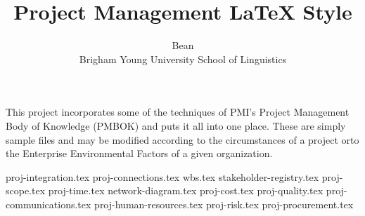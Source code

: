 
\setlength{\topmargin}{-.5in}
\setlength{\textheight}{9in}
\setlength{\oddsidemargin}{.125in}
\setlength{\textwidth}{6.25in}



\title{Project Management {LaTeX} Style}

\author{Bean\\
Brigham Young University School of Linguistics}
\renewcommand{\today}{April 13, 2013}
\maketitle
This project incorporates some of the techniques of PMI's Project Management Body of Knowledge\textregistered {} (PMBOK) and puts it all into one place. These are simply sample files and may be modified according to the circumstances of a project orto the Enterprise Environmental Factors of a given organization.


 {proj-integration.tex}
 {proj-connections.tex}
 {wbs.tex}
 {stakeholder-registry.tex}
 {proj-scope.tex}
 {proj-time.tex}
 {network-diagram.tex}
 {proj-cost.tex}
 {proj-quality.tex}
 {proj-communications.tex}
 {proj-human-resources.tex}
 {proj-risk.tex}
 {proj-procurement.tex}




